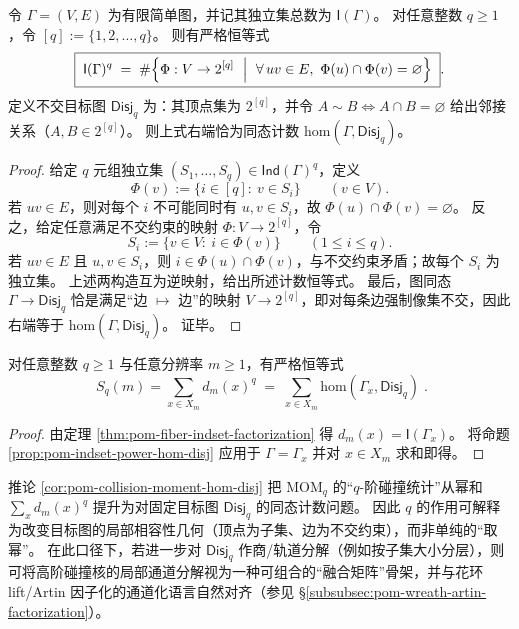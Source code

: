 \begin{proposition}[独立集幂与不交目标图同态计数的严格恒等式]\label{prop:pom-indset-power-hom-disj}
令 \(\Gamma=(V,E)\) 为有限简单图，并记其独立集总数为 \(\mathsf{I}(\Gamma)\)。
对任意整数 \(q\ge 1\)，令 \([q]:=\{1,2,\dots,q\}\)。
则有严格恒等式
\[
\boxed{\;
\mathsf{I}(\Gamma)^q
\;=\;
\#\Bigl\{\Phi:V\to 2^{[q]}\ \Bigm|\ \forall\,uv\in E,\ \Phi(u)\cap\Phi(v)=\varnothing\Bigr\}\; }.
\]
定义不交目标图 \(\mathsf{Disj}_q\) 为：其顶点集为 \(2^{[q]}\)，并令
\(
A\sim B \iff A\cap B=\varnothing
\)
给出邻接关系（\(A,B\in 2^{[q]}\)）。
则上式右端恰为同态计数 \(\mathrm{hom}(\Gamma,\mathsf{Disj}_q)\)。
\end{proposition}
\begin{proof}
给定 \(q\) 元组独立集 \((S_1,\dots,S_q)\in\mathsf{Ind}(\Gamma)^q\)，定义
\[
\Phi(v):=\{i\in[q]:\ v\in S_i\}\qquad(v\in V).
\]
若 \(uv\in E\)，则对每个 \(i\) 不可能同时有 \(u,v\in S_i\)，故 \(\Phi(u)\cap\Phi(v)=\varnothing\)。
反之，给定任意满足不交约束的映射 \(\Phi:V\to 2^{[q]}\)，令
\[
S_i:=\{v\in V:\ i\in\Phi(v)\}\qquad(1\le i\le q).
\]
若 \(uv\in E\) 且 \(u,v\in S_i\)，则 \(i\in\Phi(u)\cap\Phi(v)\)，与不交约束矛盾；故每个 \(S_i\) 为独立集。
上述两构造互为逆映射，给出所述计数恒等式。
最后，图同态 \(\Gamma\to\mathsf{Disj}_q\) 恰是满足“边 \(\mapsto\) 边”的映射 \(V\to 2^{[q]}\)，即对每条边强制像集不交，因此右端等于 \(\mathrm{hom}(\Gamma,\mathsf{Disj}_q)\)。
证毕。
\end{proof}

\begin{corollary}\label{cor:pom-collision-moment-hom-disj}
对任意整数 \(q\ge 1\) 与任意分辨率 \(m\ge 1\)，有严格恒等式
\[
\boxed{\;
S_q(m)=\sum_{x\in X_m} d_m(x)^q
\;=\;
\sum_{x\in X_m}\mathrm{hom}(\Gamma_x,\mathsf{Disj}_q)\; }.
\]
\end{corollary}
\begin{proof}
由定理 \ref{thm:pom-fiber-indset-factorization} 得 \(d_m(x)=\mathsf{I}(\Gamma_x)\)。
将命题 \ref{prop:pom-indset-power-hom-disj} 应用于 \(\Gamma=\Gamma_x\) 并对 \(x\in X_m\) 求和即得。
\end{proof}

\begin{remark}\label{rem:pom-disj-target-graph-fusion}
推论 \ref{cor:pom-collision-moment-hom-disj} 把 \(\mathrm{MOM}_q\) 的“\(q\)-阶碰撞统计”从幂和 \(\sum_x d_m(x)^q\) 提升为对固定目标图 \(\mathsf{Disj}_q\) 的同态计数问题。
因此 \(q\) 的作用可解释为改变目标图的局部相容性几何（顶点为子集、边为不交约束），而非单纯的“取幂”。
在此口径下，若进一步对 \(\mathsf{Disj}_q\) 作商/轨道分解（例如按子集大小分层），则可将高阶碰撞核的局部通道分解视为一种可组合的“融合矩阵”骨架，并与花环 lift/Artin 因子化的通道化语言自然对齐（参见 \S\ref{subsubsec:pom-wreath-artin-factorization}）。
\end{remark}

